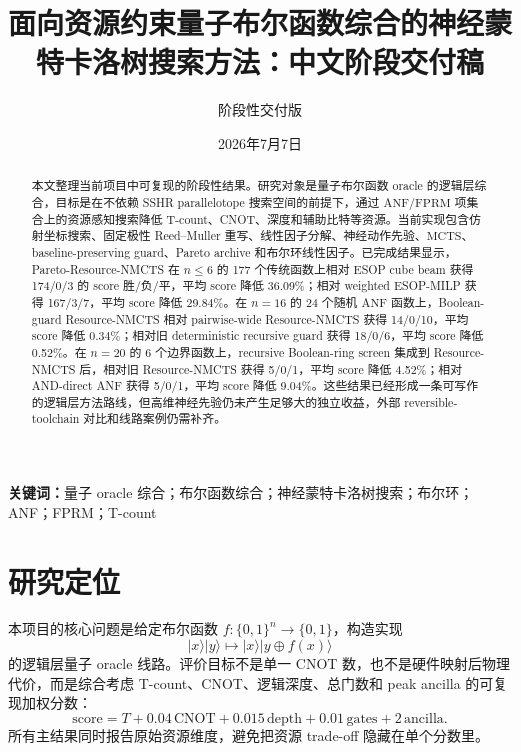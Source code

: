\documentclass[UTF8,fontset=macnew,11pt]{ctexart}
\title{面向资源约束量子布尔函数综合的神经蒙特卡洛树搜索方法：中文阶段交付稿}
\author{阶段性交付版}
\date{2026年7月7日}
\newcommand{\method}{Resource-NMCTS}
\newcommand{\pareto}{Pareto-Resource-NMCTS}
\newcommand{\score}{\ensuremath{\mathrm{score}}}
\newcommand{\anf}{\ensuremath{\mathrm{ANF}}}
\newcommand{\fprm}{\ensuremath{\mathrm{FPRM}}}
\newcommand{\mcts}{\ensuremath{\mathrm{MCTS}}}
\begin{document}
\maketitle

\begin{abstract}
本文整理当前项目中可复现的阶段性结果。研究对象是量子布尔函数 oracle 的逻辑层综合，目标是在不依赖 SSHR parallelotope 搜索空间的前提下，通过 \anf{}/\fprm{} 项集合上的资源感知搜索降低 T-count、CNOT、深度和辅助比特等资源。当前实现包含仿射坐标搜索、固定极性 Reed--Muller 重写、线性因子分解、神经动作先验、\mcts{}、baseline-preserving guard、Pareto archive 和布尔环线性因子。已完成结果显示，\pareto{} 在 $n\leq6$ 的 177 个传统函数上相对 ESOP cube beam 获得 174/0/3 的 score 胜/负/平，平均 score 降低 36.09\%；相对 weighted ESOP-MILP 获得 167/3/7，平均 score 降低 29.84\%。在 $n=16$ 的 24 个随机 \anf{} 函数上，Boolean-guard \method{} 相对 pairwise-wide \method{} 获得 14/0/10，平均 score 降低 0.34\%；相对旧 deterministic recursive guard 获得 18/0/6，平均 score 降低 0.52\%。在 $n=20$ 的 6 个边界函数上，recursive Boolean-ring screen 集成到 \method{} 后，相对旧 \method{} 获得 5/0/1，平均 score 降低 4.52\%；相对 AND-direct ANF 获得 5/0/1，平均 score 降低 9.04\%。这些结果已经形成一条可写作的逻辑层方法路线，但高维神经先验仍未产生足够大的独立收益，外部 reversible-toolchain 对比和线路案例仍需补齐。
\end{abstract}

\noindent\textbf{关键词：}量子 oracle 综合；布尔函数综合；神经蒙特卡洛树搜索；布尔环；ANF；FPRM；T-count

\section{研究定位}

本项目的核心问题是给定布尔函数 $f:\{0,1\}^n\rightarrow\{0,1\}$，构造实现
\begin{equation}
  |x\rangle |y\rangle \mapsto |x\rangle |y\oplus f(x)\rangle
  \label{eq:oracle}
\end{equation}
的逻辑层量子 oracle 线路。评价目标不是单一 CNOT 数，也不是硬件映射后物理代价，而是综合考虑 T-count、CNOT、逻辑深度、总门数和 peak ancilla 的可复现加权分数：
\begin{equation}
  \score = T + 0.04\,\mathrm{CNOT} + 0.015\,\mathrm{depth}
         + 0.01\,\mathrm{gates} + 2\,\mathrm{ancilla}.
  \label{eq:score}
\end{equation}
所有主结果同时报告原始资源维度，避免把资源 trade-off 隐藏在单个分数里。
\end{document}
